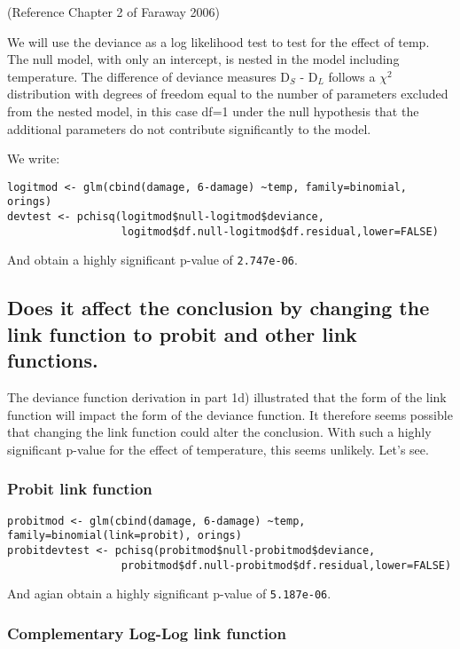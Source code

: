 \documentclass[11pt]{article}
\begin{document}
(Reference Chapter 2 of Faraway 2006)

We will use the deviance as a log likelihood test to test for the 
effect of temp. The null model, with only an intercept, is nested 
in the model including temperature. The difference of deviance
measures D$_S$ - D$_L$ follows a $\chi$$^2$ distribution with degrees of
freedom equal to the number of parameters excluded from the nested
model, in this case  df=1 under the null hypothesis that the
additional parameters do not contribute significantly to the model.



We write:

\begin{verbatim}
logitmod <- glm(cbind(damage, 6-damage) ~temp, family=binomial, orings)
devtest <- pchisq(logitmod$null-logitmod$deviance,
                  logitmod$df.null-logitmod$df.residual,lower=FALSE)
\end{verbatim}
 
 And obtain a highly significant p-value of \texttt{2.747e-06}.
 
\subsection{Does it affect the conclusion by changing the link function to probit and other link functions.}
\label{sec-2-2}


The deviance function derivation in part 1d) illustrated that the
form of the link function will impact the form of the deviance
function. It therefore seems possible that changing the link function
could alter the conclusion. With such a highly significant p-value
for the effect of temperature, this seems unlikely. Let's see.
\subsubsection{Probit link function}
\label{sec-2-2-1}



\begin{verbatim}
probitmod <- glm(cbind(damage, 6-damage) ~temp, family=binomial(link=probit), orings)
probitdevtest <- pchisq(probitmod$null-probitmod$deviance,
                  probitmod$df.null-probitmod$df.residual,lower=FALSE)
\end{verbatim}

And agian obtain a highly significant p-value of \texttt{5.187e-06}.
\subsubsection{Complementary Log-Log link function}
\label{sec-2-2-2}
\end{document}
